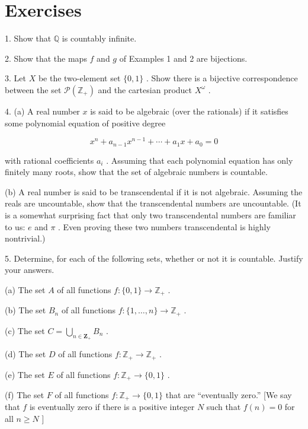\section*{Exercises}

1. Show that \(\mathbb{Q}\) is countably infinite.

2. Show that the maps \(f\) and \(g\) of Examples 1 and 2 are bijections.

3. Let \(X\) be the two-element set \(\{ 0,1\}\) . Show there is a bijective correspondence between the set \(\mathcal{P}\left( {\mathbb{Z}}_{ + }\right)\) and the cartesian product \({X}^{\omega }\) .

4. (a) A real number \(x\) is said to be algebraic (over the rationals) if it satisfies some polynomial equation of positive degree

\[
{x}^{n} + {a}_{n - 1}{x}^{n - 1} + \cdots  + {a}_{1}x + {a}_{0} = 0
\]

with rational coefficients \({a}_{i}\) . Assuming that each polynomial equation has only finitely many roots, show that the set of algebraic numbers is countable.

(b) A real number is said to be transcendental if it is not algebraic. Assuming the reals are uncountable, show that the transcendental numbers are uncountable. (It is a somewhat surprising fact that only two transcendental numbers are familiar to us: \(e\) and \(\pi\) . Even proving these two numbers transcendental is highly nontrivial.)

5. Determine, for each of the following sets, whether or not it is countable. Justify your answers.

(a) The set \(A\) of all functions \(f : \{ 0,1\}  \rightarrow  {\mathbb{Z}}_{ + }\) .

(b) The set \({B}_{n}\) of all functions \(f : \{ 1,\ldots ,n\}  \rightarrow  {\mathbb{Z}}_{ + }\) .

(c) The set \(C = \mathop{\bigcup }\limits_{{n \in  {\mathbf{Z}}_{ + }}}{B}_{n}\) .

(d) The set \(D\) of all functions \(f : {\mathbb{Z}}_{ + } \rightarrow  {\mathbb{Z}}_{ + }\) .

(e) The set \(E\) of all functions \(f : {\mathbb{Z}}_{ + } \rightarrow  \{ 0,1\}\) .

(f) The set \(F\) of all functions \(f : {\mathbb{Z}}_{ + } \rightarrow  \{ 0,1\}\) that are ``eventually zero.'' [We say that \(f\) is eventually zero if there is a positive integer \(N\) such that \(f\left( n\right)  = 0\) for all \(n \geq  N\) ]

